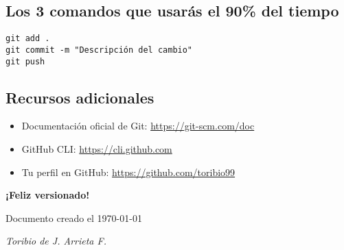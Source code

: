 \documentclass[11pt,a4paper]{article}
\begin{document}
\subsection{Los 3 comandos que usarás el 90\% del tiempo}

\begin{lstlisting}[style=bashstyle]
git add .
git commit -m "Descripción del cambio"
git push
\end{lstlisting}

\subsection{Recursos adicionales}

\begin{itemize}
  \item Documentación oficial de Git: \url{https://git-scm.com/doc}
  \item GitHub CLI: \url{https://cli.github.com}
  \item Tu perfil en GitHub: \url{https://github.com/toribio99}
\end{itemize}

\vspace{1cm}
\begin{center}
\Large\textbf{¡Feliz versionado!}

\medskip
\normalsize
Documento creado el \today

\smallskip
\textit{Toribio de J. Arrieta F.}
\end{center}
\end{document}
